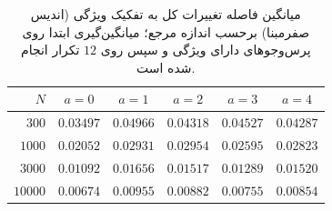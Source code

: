 \begin{table}[htbp]
\centering\small
\caption{میانگین فاصله تغییرات کل به تفکیک ویژگی (اندیس صفرمبنا) برحسب اندازه مرجع؛ میانگین‌گیری ابتدا روی پرس‌وجوهای دارای ویژگی و سپس روی $12$ تکرار انجام شده است.}
\label{tab:ch4-q-feature-tv}
\begin{tabular}{rccccc}\hline
$N$ & $a=0$ & $a=1$ & $a=2$ & $a=3$ & $a=4$\\\hline
$300$ & $0.03497$ & $0.04966$ & $0.04318$ & $0.04527$ & $0.04287$\\
$1000$ & $0.02052$ & $0.02931$ & $0.02954$ & $0.02595$ & $0.02823$\\
$3000$ & $0.01092$ & $0.01656$ & $0.01517$ & $0.01289$ & $0.01520$\\
$10000$ & $0.00674$ & $0.00955$ & $0.00882$ & $0.00755$ & $0.00854$\\
\hline
\end{tabular}
\end{table}

